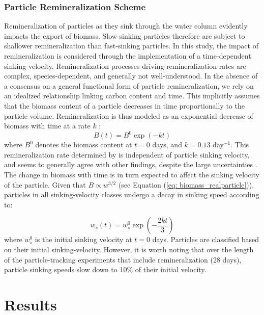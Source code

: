 \documentclass[draft,linenumbers]{agujournal2018}
\begin{document}
\subsubsection{Particle Remineralization Scheme}
\label{sec: remin_scheme}
Remineralization of particles as they sink through the water column evidently impacts the export of biomass. Slow-sinking particles therefore are subject to shallower remineralization than fast-sinking particles. In this study, the impact of remineralization is considered through the implementation of a time-dependent sinking velocity. Remineralization processes driving remineralization rates are complex, species-dependent, and generally not well-understood. In the absence of a consensus on a general functional form of particle remineralization, we rely on an idealized relationship linking carbon content and time. This implicitly assumes that the biomass content of a particle decreases in time proportionally to the particle volume. Remineralization is thus modeled as an exponential decrease of biomass with time at a rate $k$ \citep{Iversen_2010, Iversen_2013}:
\begin{equation}
	B (t) = B^0\exp(-kt)
	\label{eq: remin_scheme}
\end{equation}
where $B^0$ denotes the biomass content at $t = 0$ days, and $k = 0.13$ day$^{-1}$. This remineralization rate determined by \cite{Iversen_2010} is independent of particle sinking velocity, and seems to generally agree with other findings, despite the large uncertainties \citep{Ploug_2008, Iversen_2013}. The change in biomass with time is in turn expected to affect the sinking velocity of the particle. Given that $B \propto w^{3/2}$ (see Equation (\ref{eq: biomass_realparticle})), particles in all sinking-velocity classes undergo a decay in sinking speed according to:

\begin{equation}
w_s (t) = w_s^0\exp(-\frac{2kt}{3})
\label{eq: sinking_velocity_remin}
\end{equation}
where $w_s^0$ is the initial sinking velocity at $t = 0$ days. Particles are classified based on their initial sinking-velocity. However, it is worth noting that over the length of the particle-tracking experiments that include remineralization (28 days), particle sinking speeds slow down to 10\% of their initial velocity.

\section{Results}
\label{sec: Results}
\end{document}
